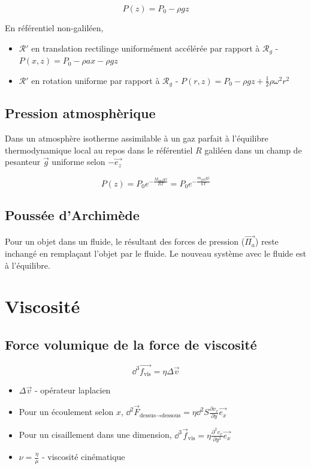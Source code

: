 \documentclass[openany]{book}
\begin{document}
\[ P(z) = P_0 - \rho g z \]

En référentiel non-galiléen, 
\begin{itemize}
    \item $\mathcal{R'}$ en translation rectilinge uniformément accélérée par rapport à $\mathcal{R}_g$ - $ P(x,z) = P_0 - \rho a x - \rho g z $
    \item $\mathcal{R'}$ en rotation uniforme par rapport à $\mathcal{R}_g$ - $P(r, z) = P_0 - \rho g z + \frac{1}{2}\rho \omega^2 r^2$
\end{itemize}

\subsection{Pression atmosphèrique}
Dans un atmosphère isotherme assimilable à un gaz parfait à l'équilibre thermodynamique local au repos dans le référentiel $R$ galiléen dans un champ de pesanteur $\vec{g}$ uniforme selon $-\vec{e_z}$

\[ P(z) = P_0 e^{-\frac{M_{\text{mol}}gz}{RT}} = P_0 e^{-\frac{m_{\text{gaz}}gz}{kT}} \]

\noindent [Démonstration - Avec la loi des gaz parfaits, $P = \rho \frac{RT}{M_{\text{mol}}} = \rho \frac{kT}{m_{\text{gaz}}} $]

\subsection{Poussée d'Archimède}
Pour un objet dans un fluide, le résultant des forces de pression ($\vec{\Pi_a}$) reste inchangé en remplaçant l'objet par le fluide. Le nouveau système avec le fluide est à l'équilibre. 

\section{Viscosité}

\subsection{Force volumique de la force de viscosité}

\[ \dd^3 \vec{f_{\text{vis}}} = \eta \Delta \vec{v} \]

\begin{itemize}
    \item $\Delta \vec{v}$ - opérateur laplacien
    \item Pour un écoulement selon $x$, $\dd^2\vec{F}_{\text{dessus}\rightarrow\text{dessous}} = \eta \dd^2 S \frac{\partial v_x}{\partial y} \vec{e_x}$
    \item Pour un cisaillement dans une dimension, $\dd^3 \vec{f}_{\text{vis}} =  \eta \frac{\partial^2 v_x}{\partial y^2} \vec{e_x}$
    \item $\nu = \frac{\eta}{\mu}$ - viscosité cinématique
\end{itemize}
\end{document}
